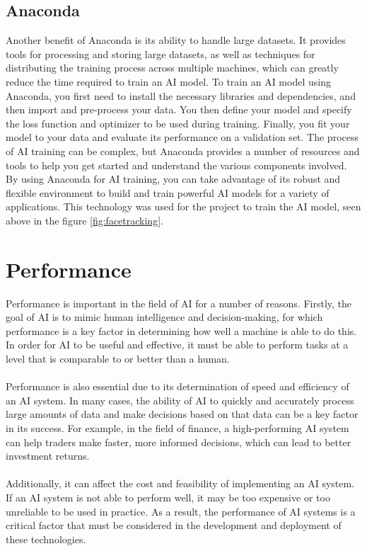\subsection{Anaconda}
Another benefit of Anaconda is its ability to handle large datasets. 
It provides tools for processing and storing large datasets, as well as techniques 
for distributing the training process across multiple machines, which can greatly 
reduce the time required to train an AI model.
To train an AI model using Anaconda, you first need to install the necessary libraries and 
dependencies, and then import and pre-process your data. You then define your model and specify 
the loss function and optimizer to be used during training. Finally, you fit your model to your 
data and evaluate its performance on a validation set.
The process of AI training can be complex, but Anaconda provides a number of resources and tools 
to help you get started and understand the various components involved. By using Anaconda for AI 
training, you can take advantage of its robust and flexible environment to build and train powerful 
AI models for a variety of applications. This technology was used for the project to train the AI model,
seen above in the figure \ref{fig:facetracking}.

\section{Performance}
Performance is important in the field of AI for a number of reasons. 
Firstly, the goal of AI is to mimic human intelligence and decision-making, 
for which performance is a key factor in determining how well a machine is able 
to do this. In order for AI to be useful and effective, it must be able to perform 
tasks at a level that is comparable to or better than a human. \cite{Performance}
\\
\\
Performance is also essential due to its determination of speed and efficiency of an AI 
system. In many cases, the ability of AI to quickly and accurately process large amounts 
of data and make decisions based on that data can be a key factor in its success. For example, 
in the field of finance, a high-performing AI system can help traders make faster, more informed
decisions, which can lead to better investment returns.
\\
\\
Additionally, it can affect the cost and feasibility of implementing an AI system. 
If an AI system is not able to perform well, it may be too expensive or too unreliable 
to be used in practice. As a result, the performance of AI systems is a critical factor 
that must be considered in the development and deployment of these technologies.

